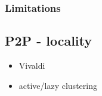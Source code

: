 \subsubsection{Limitations}






\subsection{P2P - locality}

\begin{itemize}
	
	\item Vivaldi

	\item active/lazy clustering

\end{itemize}
